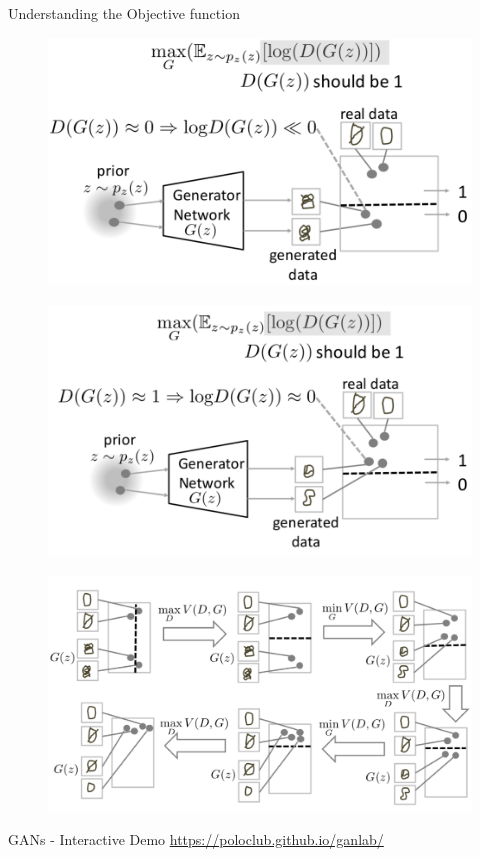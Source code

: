 \begin{frame}[allowframebreaks]{Understanding the Objective function}
\framebreak
\begin{figure}
    \centering
    \includegraphics[height=0.9\textheight, width=\textwidth, keepaspectratio]{images/gan/gan_cost_3.png}
\end{figure}

\framebreak
\begin{figure}
    \centering
    \includegraphics[height=0.9\textheight, width=\textwidth, keepaspectratio]{images/gan/gan_cost_4.png}
\end{figure}

\framebreak
\begin{figure}
    \centering
    \includegraphics[height=0.9\textheight, width=\textwidth, keepaspectratio]{images/gan/gan_cost_5.png}
\end{figure}


\end{frame}

\begin{frame}{GANs - Interactive Demo}
\centering
\href{https://poloclub.github.io/ganlab/}{https://poloclub.github.io/ganlab/}
    
\end{frame}